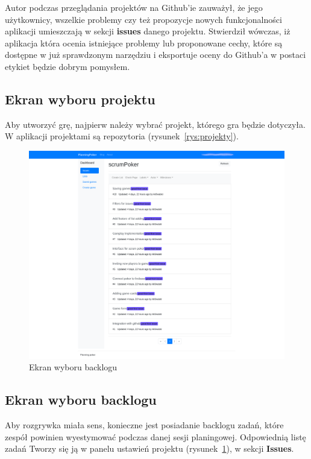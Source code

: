 Autor podczas przeglądania projektów na Github'ie zauważył, że jego użytkownicy,
wszelkie problemy czy też propozycje nowych funkcjonalności aplikacji umieszczają
w sekcji \textbf{issues} danego projektu. Stwierdził wówczas, iż aplikacja która ocenia
istniejące problemy lub proponowane cechy, które są dostępne w już sprawdzonym narzędziu
i eksportuje oceny do Github'a w postaci etykiet będzie dobrym pomysłem.


\subsection{Ekran wyboru projektu}

Aby utworzyć grę, najpierw należy wybrać projekt, którego gra będzie dotyczyła.
W aplikacji projektami są repozytoria (rysunek~\ref{rys:projekty}).

\begin{figure}[h]
	\centering\includegraphics[width=\textwidth]{img/Issues.png}
	\caption{Ekran wyboru backlogu}\label{rys:issues}%
\end{figure}


\subsection{Ekran wyboru backlogu}

Aby rozgrywka miała sens, konieczne jest posiadanie backlogu zadań,
które zespół powinien wyestymować podczas danej sesji planingowej.
Odpowiednią listę zadań Tworzy się ją w panelu ustawień projektu (rysunek~\ref{rys:issues}),
w sekcji \textbf{Issues}.


